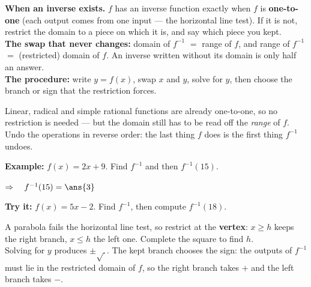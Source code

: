 \documentclass[12pt]{article}
\begin{document}

\begin{formulabox}
\textbf{When an inverse exists.} $f$ has an inverse function exactly when $f$
is \textbf{one-to-one} (each output comes from one input --- the horizontal
line test). If it is not, restrict the domain to a piece on which it is, and
say which piece you kept.\\[3pt]
\textbf{The swap that never changes:} domain of $f^{-1}$ $=$ range of $f$, and
range of $f^{-1}$ $=$ (restricted) domain of $f$. An inverse written without
its domain is only half an answer.\\[3pt]
\textbf{The procedure:} write $y = f(x)$, swap $x$ and $y$, solve for $y$, then
choose the branch or sign that the restriction forces.
\end{formulabox}


\begin{formulabox}
Linear, radical and simple rational functions are already one-to-one, so no
restriction is needed --- but the domain still has to be read off the
\emph{range} of $f$. Undo the operations in reverse order: the last thing $f$
does is the first thing $f^{-1}$ undoes.
\end{formulabox}

\begin{examplebox}
\textbf{Example:} $f(x) = 2x + 9$. Find $f^{-1}$ and then $f^{-1}(15)$.

$\Rightarrow\quad f^{-1}(15) = \ans{3}$
\end{examplebox}

\begin{tryitbox}
\textbf{Try it:} $f(x) = 5x - 2$. Find $f^{-1}$, then compute
$f^{-1}(18)$.\\[2pt]
\end{tryitbox}


\begin{formulabox}
A parabola fails the horizontal line test, so restrict at the \textbf{vertex}:
$x \geq h$ keeps the right branch, $x \leq h$ the left one. Complete the square
to find $h$.\\[3pt]
Solving for $y$ produces $\pm\sqrt{\ }$. The kept branch chooses the sign: the
outputs of $f^{-1}$ must lie in the restricted domain of $f$, so the right
branch takes $+$ and the left branch takes $-$.
\end{formulabox}
\end{document}
